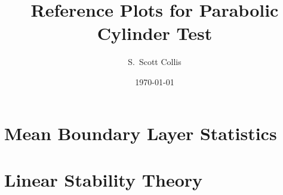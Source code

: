 \documentclass[12pt, oneside]{amsart}
\title{Reference Plots for Parabolic Cylinder Test}
\author{S.\ Scott Collis}
\date{\today}
\begin{document}
\maketitle


\section{Mean Boundary Layer Statistics}

\begin{figure}[!htb]
\centering

\end{figure}

\begin{figure}[!htb]
\centering

\end{figure}

\begin{figure}[!htb]
\centering

\end{figure}

\begin{figure}[!htb]
\centering

\end{figure}

\begin{figure}[!htb]
\centering

\end{figure}

\begin{figure}[!htb]
\centering

\end{figure}


\section{Linear Stability Theory}

\begin{figure}[!htb]
\centering

\end{figure}

\begin{figure}[!htb]
\centering

\end{figure}

\begin{figure}[!htb]
\centering

\end{figure}

\begin{figure}[!htb]
\centering

\end{figure}
\end{document}
